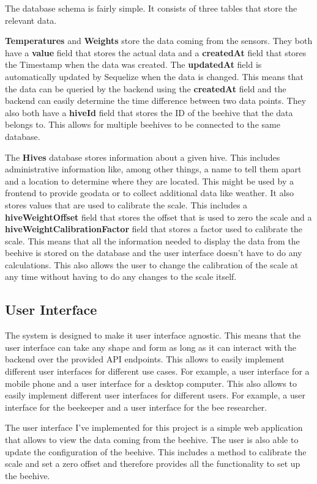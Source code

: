 The database schema is fairly simple. It consists of three tables that store the relevant data.

\textbf{Temperatures} and \textbf{Weights} store the data coming from the sensors. They both have a \textbf{value} field that stores the actual data and a \textbf{createdAt} field that stores the \Gls{Timestamp} when the data was created. The \textbf{updatedAt} field is automatically updated by Sequelize when the data is changed. This means that the data can be queried by the backend using the \textbf{createdAt} field and the backend can easily determine the time difference between two data points. They also both have a \textbf{hiveId} field that stores the ID of the beehive that the data belongs to. This allows for multiple beehives to be connected to the same database.

The \textbf{Hives} database stores information about a given hive. This includes administrative information like, among other things, a name to tell them apart and a location to determine where they are located. This might be used by a frontend to provide geodata or to collect additional data like weather. It also stores values that are used to calibrate the scale. This includes a \textbf{hiveWeightOffset} field that stores the offset that is used to zero the scale and a \textbf{hiveWeightCalibrationFactor} field that stores a factor used to calibrate the scale. This means that all the information needed to display the data from the beehive is stored on the database and the user interface doesn't have to do any calculations. This also allows the user to change the calibration of the scale at any time without having to do any changes to the scale itself.

\newpage
\subsection{User Interface}\label{sec:user_interface}
The system is designed to make it user interface agnostic. This means that the user interface can take any shape and form as long as it can interact with the backend over the provided API endpoints. This allows to easily implement different user interfaces for different use cases. For example, a user interface for a mobile phone and a user interface for a desktop computer. This also allows to easily implement different user interfaces for different users. For example, a user interface for the beekeeper and a user interface for the bee researcher.

The user interface I've implemented for this project is a simple web application that allows to view the data coming from the beehive. The user is also able to update the configuration of the beehive. This includes a method to calibrate the scale and set a zero offset and therefore provides all the functionality to set up the beehive.

